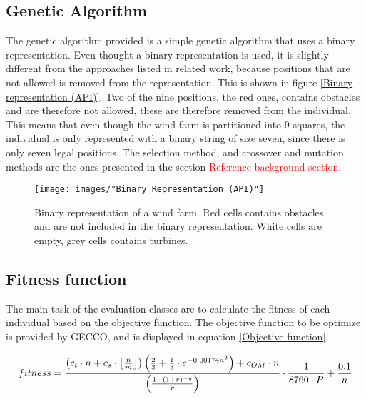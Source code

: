 \subsection{Genetic Algorithm}
The genetic algorithm provided is a simple genetic algorithm that uses a binary representation. Even thought a binary representation is used, it is slightly different from the approaches listed in related work, because positions that are not allowed is removed from the representation. This is shown in figure \ref{Binary representation (API)}. Two of the nine positions, the red ones, contains obstacles and are therefore not allowed, these are therefore removed from the individual. This means that even though the wind farm is partitioned into 9 squares, the individual is only represented with a binary string of size seven, since there is only seven legal positions. The selection method, and crossover and mutation methods are the ones presented in the section \textcolor{red}{Reference background section}.


\begin{figure}[h!]
\begin{center}
\texttt{[image: images/"Binary Representation (API)"]}
\caption{Binary representation of a wind farm. Red cells contains obstacles and are not included in the binary representation. White cells are empty, grey cells contains turbines.}
\label{Binary Representation (API)}
\end{center}
\end{figure}


\subsection{Fitness function}


The main task of the evaluation classes are to calculate the fitness of each individual based on the objective function.  The objective function to be optimize is provided by GECCO, and is displayed in equation \ref{Objective function}.\\

\begin{small}
\begin{equation}
fitness =  \frac{ \left( c_t \cdot n + c_s \cdot \floor*{\frac{n}{m}} \right) \left( \frac{2}{3} + \frac{1}{3} \cdot e^{-0.00174n^2} \right) + c_{OM} \cdot n}{\left( \frac{1 - (1 + r)^{-y}}{r} \right) } \cdot \frac{1}{8760 \cdot P} + \frac{0.1}{n}
\label{Objective function} 
\end{equation}
\end{small}


